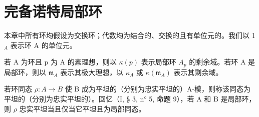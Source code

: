 \chapter{完备诺特局部环}

本章中所有环均假设为交换环；代数均为结合的、交换的且有单位元的。我们以 1 \(_{A}\) 表示环 A 的单位元。

若 A 为环且 p 为 A 的素理想，则以 \(\kappa(p)\) 表示局部环 \(A_p\) 的剩余域。若环 A 是局部环，则以 \(\mathfrak{m}_A\) 表示其极大理想，以 \(\kappa_A\) 或 \(\kappa(\mathfrak{m}_A)\) 表示其剩余域。

  若环同态 \(\rho: A \to B\) 使 B 成为平坦的（分别为忠实平坦的）A-模，则称该同态为平坦的（分别为忠实平坦的）。回忆（I, § 3, n° 5, 命题 9），若 A 和 B 是局部环，则 \(\rho\) 忠实平坦当且仅当它平坦且为局部同态。

